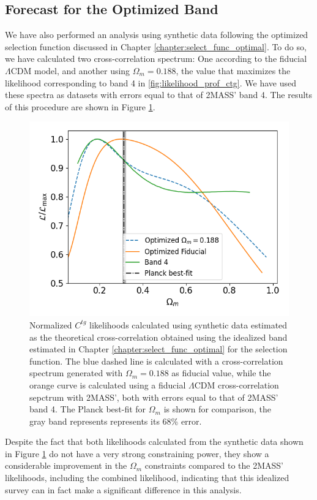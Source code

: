 \documentclass[openany,a4paper,12pt,oneside]{book}
\begin{document}
\begin{spacing}{1.5}
\section{Forecast for the Optimized Band}

We have also performed an analysis using synthetic data following the optimized selection function discussed in Chapter \ref{chapter:select_func_optimal}. To do so, we have calculated two cross-correlation spectrum: One according to the fiducial $\Lambda$CDM model, and another using $\Omega_m=0.188$, the value that maximizes the likelihood corresponding to band 4 in \ref{fig:likelihood_prof_ctg}. We have used these spectra as datasets with errors equal to that of 2MASS' band 4. The results of this procedure are shown in Figure \ref{fig:likelihood_band_optimal}.

\begin{figure}[!htb]
	\centering
	\includegraphics[width=.7\linewidth]{Imagens/profile_BestBand.png}
	\caption{Normalized $C^{tg}$ likelihoods calculated using synthetic data estimated as the theoretical cross-correlation obtained using the idealized band estimated in Chapter \ref{chapter:select_func_optimal} for the selection function. The blue dashed line is calculated with a cross-correlation spectrum generated with $\Omega_m=0.188$ as fiducial value, while the orange curve is calculated using a fiducial $\Lambda$CDM cross-correlation sepctrum with 2MASS', both with errors equal to that of 2MASS' band 4. The Planck best-fit for $\Omega_m$ is shown for comparison, the gray band represents represents its 68\% error.}
	\label{fig:likelihood_band_optimal}
\end{figure}

Despite the fact that both likelihoods calculated from the synthetic data shown in Figure \ref{fig:likelihood_band_optimal} do not have a very strong constraining power, they show a considerable improvement in the $\Omega_m$ constraints compared to the 2MASS' likelihoods, including the combined likelihood, indicating that this idealized survey can in fact make a significant difference in this analysis. 


\end{spacing}
\end{document}
